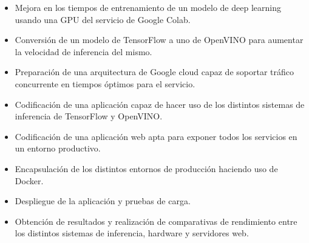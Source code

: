 \begin{itemize}
    \item Mejora en los tiempos de entrenamiento de un modelo de deep learning usando una GPU del servicio de Google Colab.
    \item Conversión de un modelo de TensorFlow a uno de OpenVINO para aumentar la velocidad de inferencia del mismo.
    \item Preparación de una arquitectura de Google cloud capaz de soportar tráfico concurrente en tiempos óptimos para el servicio.
    \item Codificación de una aplicación capaz de hacer uso de los distintos sistemas de inferencia de TensorFlow y OpenVINO.
    \item Codificación de una aplicación web apta para exponer todos los servicios en un entorno productivo.
    \item Encapsulación de los distintos entornos de producción haciendo uso de Docker.
    \item Despliegue de la aplicación y pruebas de carga.
    \item Obtención de resultados y realización de comparativas de rendimiento entre los distintos sistemas de inferencia, hardware y servidores web.
\end{itemize}



